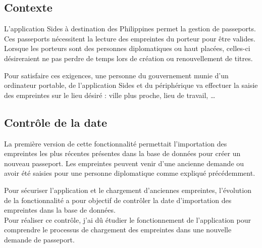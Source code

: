 \subsection{Contexte}

L'application Sides à destination des Philippines permet la gestion de passeports.
Ces passeports nécessitent la lecture des empreintes du porteur pour être valides.
Lorsque les porteurs sont des personnes diplomatiques ou haut placées, celles-ci désireraient ne pas perdre de temps lors de création ou renouvellement de titres.

Pour satisfaire ces exigences, une personne du gouvernement munie d'un ordinateur portable, de l'application Sides et du périphérique va effectuer la saisie des empreintes sur le lieu désiré : ville plus proche, lieu de travail, \ldots


\subsection{Contrôle de la date}

La première version de cette fonctionnalité permettait l'importation des empreintes les plus récentes présentes dans la base de données pour créer un nouveau passeport.
Les empreintes peuvent venir d'une ancienne demande ou avoir été saisies pour une personne diplomatique comme expliqué précédemment.

Pour sécuriser l'application et le chargement d'anciennes empreintes, l'évolution de la fonctionnalité a pour objectif de contrôler la date d'importation des empreintes dans la base de données.
\\

Pour réaliser ce contrôle, j'ai dû étudier le fonctionnement de l'application pour comprendre le processus de chargement des empreintes dans une nouvelle demande de passeport.


